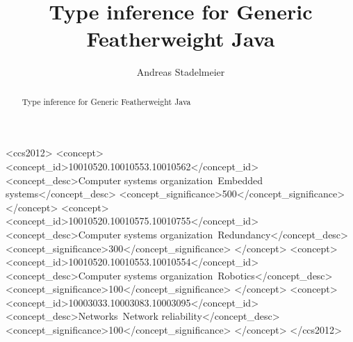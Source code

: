\documentclass[acmsmall,screen,review]{acmart}
\begin{document}
\title{Type inference for Generic Featherweight Java}

\author{Andreas Stadelmeier}


\renewcommand{\shortauthors}{Stadelmeier, Plümicke, Thiemann}

\begin{abstract}
  Type inference for Generic Featherweight Java
\end{abstract}

\begin{CCSXML}
<ccs2012>
 <concept>
  <concept_id>10010520.10010553.10010562</concept_id>
  <concept_desc>Computer systems organization~Embedded systems</concept_desc>
  <concept_significance>500</concept_significance>
 </concept>
 <concept>
  <concept_id>10010520.10010575.10010755</concept_id>
  <concept_desc>Computer systems organization~Redundancy</concept_desc>
  <concept_significance>300</concept_significance>
 </concept>
 <concept>
  <concept_id>10010520.10010553.10010554</concept_id>
  <concept_desc>Computer systems organization~Robotics</concept_desc>
  <concept_significance>100</concept_significance>
 </concept>
 <concept>
  <concept_id>10003033.10003083.10003095</concept_id>
  <concept_desc>Networks~Network reliability</concept_desc>
  <concept_significance>100</concept_significance>
 </concept>
</ccs2012>
\end{CCSXML}

\end{document}

